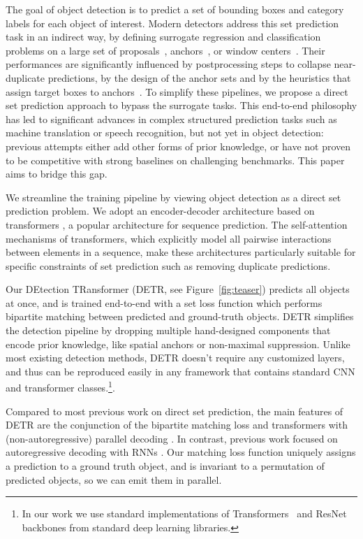 \documentclass[runningheads]{llncs}
\newcommand{\detr}{DETR\xspace}
\begin{document}
The goal of object detection is to predict a set of  bounding boxes and category labels for each object of interest.
Modern detectors address this set prediction task in an indirect way, by defining surrogate regression and classification problems on a large set of proposals~\cite{Ren2015FasterRT,Cai2019CascadeRH}, anchors~\cite{Lin2017FocalLF}, or window centers~\cite{Zhou2019objects,tian2019fcos}.
Their performances are significantly influenced by postprocessing steps to collapse near-duplicate predictions, by the design of the anchor sets and by the heuristics that assign target boxes to anchors~\cite{Zhang2019bridging}.
To simplify these pipelines, we propose a direct set prediction approach to bypass the surrogate tasks. 
This end-to-end philosophy has led to significant advances in complex structured prediction tasks such as machine translation or speech recognition, but not yet in object detection: previous attempts \cite{Stewart2015EndtoEndPD,Hosang2017LearningNS,Bodla2017SoftNMSI,rezatofighi2018deep} either add other forms of prior knowledge, or have not proven to be competitive with strong baselines on challenging benchmarks. This paper aims to bridge this gap.

We streamline the training pipeline by viewing object detection as a direct set prediction problem. We adopt an encoder-decoder architecture based on transformers \cite{Vaswani2017AttentionIA}, a popular architecture for sequence prediction. The self-attention mechanisms of transformers, which explicitly model all pairwise interactions between elements in a sequence, make these architectures particularly suitable for specific constraints of set prediction such as removing duplicate predictions. 

Our DEtection TRansformer (\detr, see Figure~\ref{fig:teaser}) predicts all objects at once, and is trained end-to-end with a set loss function which performs bipartite matching between predicted and ground-truth objects.
\detr simplifies the detection pipeline by dropping multiple hand-designed components that encode prior knowledge, like spatial anchors or non-maximal suppression. 
Unlike most existing detection methods, \detr doesn't require any customized layers, and thus can be reproduced easily in any framework that contains standard CNN and transformer classes.\footnote{In our work we use standard implementations of Transformers~\cite{Vaswani2017AttentionIA} and ResNet~\cite{He2015DeepRL} backbones from standard deep learning libraries.}.

Compared to most previous work on direct set prediction, the main features of \detr are the conjunction of the bipartite matching loss and transformers with (non-autoregressive) parallel decoding \cite{oord2017parallel,Gu2017NonAutoregressiveNM,ghazvininejad2019constant,Devlin2019BERTPO}. In contrast, previous work focused on autoregressive decoding with RNNs \cite{Stewart2015EndtoEndPD,RomeraParedes2015RecurrentIS,Park2015LearningTD,ren2017end,Salvador2017RecurrentNN}. Our matching loss function uniquely assigns a prediction to a ground truth object, and is invariant to a permutation of predicted objects, so we can emit them in parallel. 
\end{document}
